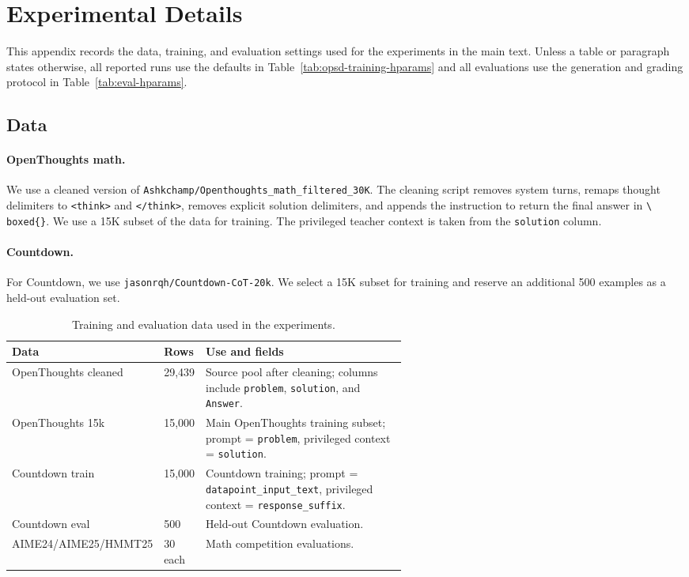 \section{Experimental Details}
\label{app:experimental-details}

This appendix records the data, training, and evaluation settings used for the
experiments in the main text. Unless a table or paragraph states otherwise, all
reported \opsd{} runs use the defaults in Table~\ref{tab:opsd-training-hparams}
and all evaluations use the generation and grading protocol in
Table~\ref{tab:eval-hparams}.

\subsection{Data}
\label{app:data}

\paragraph{OpenThoughts math.}
We use a cleaned version of \texttt{Ashkchamp/Openthoughts\_math\_filtered\_30K}.
The cleaning script removes system turns, remaps thought delimiters to
\texttt{<think>} and \texttt{</think>}, removes explicit solution delimiters,
and appends the instruction to return the final answer in \texttt{\textbackslash
boxed\{\}}. We use a 15K subset of the data for training. The privileged teacher context is taken from the \texttt{solution} column.

\paragraph{Countdown.}
For Countdown, we use \texttt{jasonrqh/Countdown-CoT-20k}. We select a 15K subset for training and reserve an additional
500 examples as a held-out evaluation set.

\begin{table}[!htbp]
    \centering
    \small
    \caption{Training and evaluation data used in the experiments.}
    \label{tab:data-summary}
    \begin{tabular}{ll>{\raggedright\arraybackslash}p{0.58\linewidth}}
        \toprule
        Data & Rows & Use and fields \\
        \midrule
        OpenThoughts cleaned & 29,439 &
        Source pool after cleaning; columns include \texttt{problem},
        \texttt{solution}, and \texttt{Answer}. \\
        OpenThoughts 15k & 15,000 &
        Main OpenThoughts \opsd{} training subset; prompt =
        \texttt{problem}, privileged context = \texttt{solution}. \\
        Countdown train & 15,000 &
        Countdown \opsd{} training; prompt =
        \texttt{datapoint\_input\_text}, privileged context =
        \texttt{response\_suffix}. \\
        Countdown eval & 500 &
        Held-out Countdown evaluation. \\
        AIME24/AIME25/HMMT25 & 30 each &
        Math competition evaluations. \\
        \bottomrule
    \end{tabular}
\end{table}

